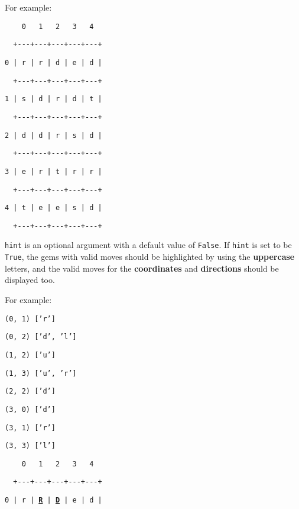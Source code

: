 \begin{itemize}
For example: 

\noindent %
\noindent\begin{minipage}[t]{1\columnwidth}%
\texttt{~~~~0~~~1~~~2~~~3~~~4}

\texttt{~~+-{}-{}-+-{}-{}-+-{}-{}-+-{}-{}-+-{}-{}-+}

\texttt{0 | r | r | d | e | d |}

\texttt{~~+-{}-{}-+-{}-{}-+-{}-{}-+-{}-{}-+-{}-{}-+}

\texttt{1 | s | d | r | d | t |}

\texttt{~~+-{}-{}-+-{}-{}-+-{}-{}-+-{}-{}-+-{}-{}-+}

\texttt{2 | d | d | r | s | d |}

\texttt{~~+-{}-{}-+-{}-{}-+-{}-{}-+-{}-{}-+-{}-{}-+}

\texttt{3 | e | r | t | r | r |}

\texttt{~~+-{}-{}-+-{}-{}-+-{}-{}-+-{}-{}-+-{}-{}-+}

\texttt{4 | t | e | e | s | d |}

\texttt{~~+-{}-{}-+-{}-{}-+-{}-{}-+-{}-{}-+-{}-{}-+}%
\end{minipage}

\texttt{hint} is an optional argument with a default value of \texttt{False}.
If \texttt{hint} is set to be \texttt{True}, the gems with valid moves
should be highlighted by using the \textbf{uppercase} letters, and
the valid moves for the \textbf{coordinates} and \textbf{directions}
should be displayed too. 

For example: 

\noindent %
\noindent\begin{minipage}[t]{1\columnwidth}%
\texttt{(0, 1) {[}'r'{]}}

\texttt{(0, 2) {[}'d', 'l'{]}}

\texttt{(1, 2) {[}'u'{]} }

\texttt{(1, 3) {[}'u', 'r'{]}}

\texttt{(2, 2) {[}'d'{]} }

\texttt{(3, 0) {[}'d'{]} }

\texttt{(3, 1) {[}'r'{]}}

\texttt{(3, 3) {[}'l'{]} }%
\end{minipage}

\noindent %
\noindent\begin{minipage}[t]{1\columnwidth}%
\texttt{~~~~0~~~1~~~2~~~3~~~4}

\texttt{~~+-{}-{}-+-{}-{}-+-{}-{}-+-{}-{}-+-{}-{}-+}

\texttt{0 | r | }\texttt{\textbf{\uline{R}}}\texttt{ | }\texttt{\textbf{\uline{D}}}\texttt{
| e | d |}


\end{minipage}
\end{itemize}
